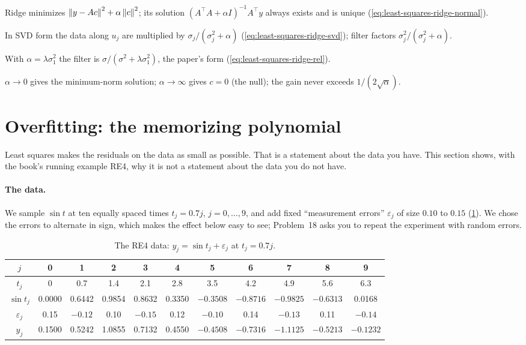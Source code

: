 \begin{keyideas}
\item Ridge minimizes $\left\lVert y-Ac\right\rVert^2+\alpha\left\lVert c\right\rVert^2$; its solution $(A^\top A+\alpha I)^{-1}A^\top y$ always exists and is unique (\cref{eq:least-squares-ridge-normal}).
\item In SVD form the data along $u_j$ are multiplied by $\sigma_j/(\sigma_j^2+\alpha)$ (\cref{eq:least-squares-ridge-svd}); filter factors $\sigma_j^2/(\sigma_j^2+\alpha)$.
\item With $\alpha = \lambda\sigma_1^2$ the filter is $\sigma/(\sigma^2+\lambda\sigma_1^2)$, the paper's form (\cref{eq:least-squares-ridge-rel}).
\item $\alpha\to0$ gives the minimum-norm solution; $\alpha\to\infty$ gives $c=0$ (the null); the gain never exceeds $1/(2\sqrt\alpha)$.
\end{keyideas}

\section{Overfitting: the memorizing polynomial}\label{sec:least-squares-overfit}

Least squares makes the residuals on the data as small as possible. That is a statement about the data you have. This section shows, with the book's running example RE4, why it is not a statement about the data you do not have.

\paragraph{The data.} We sample $\sin t$ at ten equally spaced times $t_j = 0.7j$, $j = 0,\dots,9$, and add fixed ``measurement errors'' $\varepsilon_j$ of size $0.10$ to $0.15$ (\cref{tab:least-squares-re4}). We chose the errors to alternate in sign, which makes the effect below easy to see; Problem~18 asks you to repeat the experiment with random errors.

\begin{table}[htbp]\centering
\caption{The RE4 data: $y_j = \sin t_j + \varepsilon_j$ at $t_j = 0.7j$.}\label{tab:least-squares-re4}
\small
\begin{tabular}{ccccccccccc}\toprule
$j$ & 0 & 1 & 2 & 3 & 4 & 5 & 6 & 7 & 8 & 9\\\midrule
$t_j$ & 0 & 0.7 & 1.4 & 2.1 & 2.8 & 3.5 & 4.2 & 4.9 & 5.6 & 6.3\\
$\sin t_j$ & 0.0000 & 0.6442 & 0.9854 & 0.8632 & 0.3350 & $-0.3508$ & $-0.8716$ & $-0.9825$ & $-0.6313$ & 0.0168\\
$\varepsilon_j$ & 0.15 & $-0.12$ & 0.10 & $-0.15$ & 0.12 & $-0.10$ & 0.14 & $-0.13$ & 0.11 & $-0.14$\\
$y_j$ & 0.1500 & 0.5242 & 1.0855 & 0.7132 & 0.4550 & $-0.4508$ & $-0.7316$ & $-1.1125$ & $-0.5213$ & $-0.1232$\\\bottomrule
\end{tabular}
\end{table}

